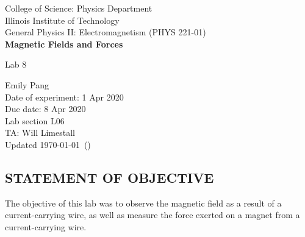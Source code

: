 \documentclass [12pt, letterpaper, twoside]{article}
\begin{document}
\begin{titlepage}
\begin{center}
College of Science: Physics Department \\
\vspace{0.1cm}
Illinois Institute of Technology\\
\vspace{0.1cm}
General Physics II: Electromagnetism (PHYS 221-01)\\
\vspace*{\fill}
\begingroup
\Large
\textbf{Magnetic Fields and Forces}
\vspace{0.35cm}

\normalsize
Lab 8
\vspace{1.5cm}
\endgroup
\vspace*{\fill}
\end{center}

\vspace*{\fill}
\begin{flushright}
\footnotesize
Emily Pang \\
Date of experiment: 1 Apr 2020 \\
Due date: 8 Apr 2020 \\
Lab section L06 \\
TA: Will Limestall \\
Updated \usdate\today~(\currenttime)
\end{flushright}
\end{titlepage}
\subsection*{STATEMENT OF OBJECTIVE}
The objective of this lab was to observe the magnetic field as a result of a current-carrying wire, as well as measure the force exerted on a magnet from a current-carrying wire.
\end{document}
